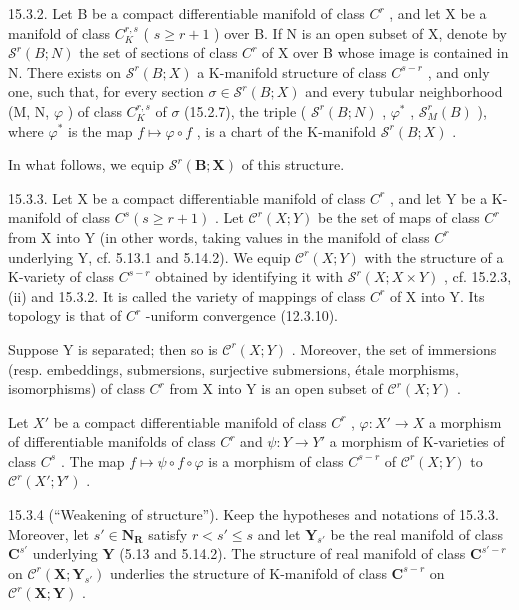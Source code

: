 15.3.2. Let B be a compact differentiable manifold of class \(C^{r}\) , and let X be a manifold of class \(C_{K}^{r,s}\) ( \(s \geqslant r + 1\) ) over B. If N is an open subset of X, denote by \(\mathcal{S}^{r}(B; N)\) the set of sections of class \(C^{r}\) of X over B whose image is contained in N. There exists on \(\mathcal{S}^{r}(B; X)\) a K-manifold structure of class \(C^{s-r}\) , and only one, such that, for every section \(\sigma \in \mathcal{S}^{r}(B; X)\) and every tubular neighborhood (M, N, \(\varphi\) ) of class \(C_{K}^{r,s}\) of \(\sigma\) (15.2.7), the triple ( \(\mathcal{S}^{r}(B; N)\) , \(\varphi^{*}\) , \(\mathcal{S}_{M}^{r}(B)\) ), where \(\varphi^{*}\) is the map \(f \mapsto \varphi \circ f\) , is a chart of the K-manifold \(\mathcal{S}^{r}(B; X)\) .

In what follows, we equip \(\mathcal{S}^{r}(\mathbf{B};\mathbf{X})\) of this structure.

15.3.3. Let X be a compact differentiable manifold of class \(C^{r}\) , and let Y be a K-manifold of class \(C^{s}(s \geqslant r + 1)\) . Let \(\mathcal{C}^{r}(X; Y)\) be the set of maps of class \(C^{r}\) from X into Y (in other words, taking values in the manifold of class \(C^{r}\) underlying Y, cf. 5.13.1 and 5.14.2). We equip \(\mathcal{C}^{r}(X; Y)\) with the structure of a K-variety of class \(C^{s-r}\) obtained by identifying it with \(\mathcal{S}^{r}(X; X \times Y)\) , cf. 15.2.3, (ii) and 15.3.2. It is called the variety of mappings of class \(C^{r}\) of X into Y. Its topology is that of \(C^{r}\) -uniform convergence (12.3.10).

Suppose Y is separated; then so is \(\mathcal{C}^{r}(X;Y)\) . Moreover, the set of immersions (resp. embeddings, submersions, surjective submersions, étale morphisms, isomorphisms) of class \(C^{r}\) from X into Y is an open subset of \(\mathcal{C}^{r}(X;Y)\) .

Let \(X'\) be a compact differentiable manifold of class \(C^r\) , \(\varphi: X' \to X\) a morphism of differentiable manifolds of class \(C^r\) and \(\psi: Y \to Y'\) a morphism of K-varieties of class \(C^s\) . The map \(f \mapsto \psi \circ f \circ \varphi\) is a morphism of class \(C^{s-r}\) of \(\mathscr{C}^r(X; Y)\) to \(\mathscr{C}^r(X'; Y')\) .

15.3.4 (“Weakening of structure”). Keep the hypotheses and notations of 15.3.3. Moreover, let \(s' \in \mathbf{N}_{\mathbf{R}}\) satisfy \(r < s' \leqslant s\) and let \(\mathbf{Y}_{s'}\) be the real manifold of class \(\mathbf{C}^{s'}\) underlying \(\mathbf{Y}\) (5.13 and 5.14.2). The structure of real manifold of class \(\mathbf{C}^{s'-r}\) on \(\mathcal{C}^r(\mathbf{X}; \mathbf{Y}_{s'})\) underlies the structure of K-manifold of class \(\mathbf{C}^{s-r}\) on \(\mathcal{C}^r(\mathbf{X}; \mathbf{Y})\) .

